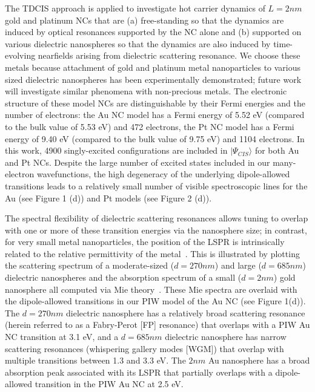 \documentclass[journal=jpclcd,manuscript=article]{achemso}
\begin{document}
The TDCIS approach is applied to investigate hot carrier dynamics of $L=2nm$ gold and platinum NCs that are (a) free-standing so that
the dynamics are induced by optical resonances supported by the NC alone and (b) supported on various dielectric nanospheres so
that the dynamics are also induced by time-evolving nearfields arising from dielectric scattering resonance.  We choose these metals because 
attachment of gold and platinum metal nanoparticles to various sized dielectric nanospheres has been experimentally demonstrated; future
work will investigate similar phenomena with non-precious metals.
The electronic structure
of these model NCs are distinguishable by their Fermi energies and the number of electrons: the Au NC model has a Fermi energy
of 5.52 eV (compared to the bulk value of 5.53 eV) and 472 electrons, the Pt NC model has a Fermi energy of 9.40 eV (compared to the bulk
value of 9.75 eV) and 1104 electrons. 
In this work, 4900 singly-excited configurations are included in $|\Psi_{CIS}\rangle$ for both Au and Pt NCs.  
Despite the large number of excited states included in our many-electron wavefunctions, the high 
degeneracy of the underlying dipole-allowed transitions leads to a relatively small number of visible spectroscopic lines for the Au (see Figure 1 (d))
and Pt models (see Figure 2 (d)). 

The spectral flexibility of dielectric scattering
resonances allows tuning to overlap with one or more of these transition energies via the nanosphere size; in contrast, for very small 
metal nanoparticles, the position of the LSPR is intrinsically related to the relative permittivity of the metal~\cite{Bohren}.  This is
illustrated by plotting the scattering spectrum of a moderate-sized ($d=270nm$) and large ($d=685nm$) dielectric nanospheres and the 
absorption spectrum of a small ($d=2nm$) gold nanosphere all computed via Mie theory~\cite{Bohren}.  These Mie spectra are overlaid with the dipole-allowed
transitions in our PIW model of the Au NC (see Figure 1(d)). The $d=270nm$ dielectric nanosphere has a relatively broad scattering resonance 
(herein referred to as a Fabry-Perot [FP] resonance) that overlaps 
with a PIW Au NC transition at 3.1 eV, and
a $d=685nm$ dielectric nanosphere has narrow scattering resonances (whispering gallery modes [WGM]) 
that overlap with multiple transitions between 1.3 and 3.3 eV.  The $2nm$ Au nanosphere has a broad absorption peak associated with its LSPR that partially
overlaps with a dipole-allowed transition in the PIW Au NC at 2.5 eV. 
\end{document}
